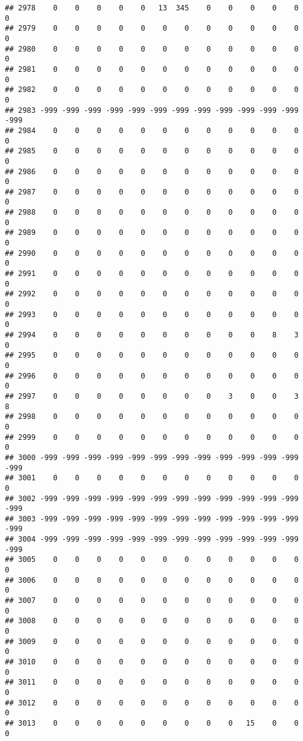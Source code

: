 \documentclass[]{article}
\begin{document}
\begin{verbatim}
## 2978    0    0    0    0    0   13  345    0    0    0    0    0    0
## 2979    0    0    0    0    0    0    0    0    0    0    0    0    0
## 2980    0    0    0    0    0    0    0    0    0    0    0    0    0
## 2981    0    0    0    0    0    0    0    0    0    0    0    0    0
## 2982    0    0    0    0    0    0    0    0    0    0    0    0    0
## 2983 -999 -999 -999 -999 -999 -999 -999 -999 -999 -999 -999 -999 -999
## 2984    0    0    0    0    0    0    0    0    0    0    0    0    0
## 2985    0    0    0    0    0    0    0    0    0    0    0    0    0
## 2986    0    0    0    0    0    0    0    0    0    0    0    0    0
## 2987    0    0    0    0    0    0    0    0    0    0    0    0    0
## 2988    0    0    0    0    0    0    0    0    0    0    0    0    0
## 2989    0    0    0    0    0    0    0    0    0    0    0    0    0
## 2990    0    0    0    0    0    0    0    0    0    0    0    0    0
## 2991    0    0    0    0    0    0    0    0    0    0    0    0    0
## 2992    0    0    0    0    0    0    0    0    0    0    0    0    0
## 2993    0    0    0    0    0    0    0    0    0    0    0    0    0
## 2994    0    0    0    0    0    0    0    0    0    0    8    3    0
## 2995    0    0    0    0    0    0    0    0    0    0    0    0    0
## 2996    0    0    0    0    0    0    0    0    0    0    0    0    0
## 2997    0    0    0    0    0    0    0    0    3    0    0    3    8
## 2998    0    0    0    0    0    0    0    0    0    0    0    0    0
## 2999    0    0    0    0    0    0    0    0    0    0    0    0    0
## 3000 -999 -999 -999 -999 -999 -999 -999 -999 -999 -999 -999 -999 -999
## 3001    0    0    0    0    0    0    0    0    0    0    0    0    0
## 3002 -999 -999 -999 -999 -999 -999 -999 -999 -999 -999 -999 -999 -999
## 3003 -999 -999 -999 -999 -999 -999 -999 -999 -999 -999 -999 -999 -999
## 3004 -999 -999 -999 -999 -999 -999 -999 -999 -999 -999 -999 -999 -999
## 3005    0    0    0    0    0    0    0    0    0    0    0    0    0
## 3006    0    0    0    0    0    0    0    0    0    0    0    0    0
## 3007    0    0    0    0    0    0    0    0    0    0    0    0    0
## 3008    0    0    0    0    0    0    0    0    0    0    0    0    0
## 3009    0    0    0    0    0    0    0    0    0    0    0    0    0
## 3010    0    0    0    0    0    0    0    0    0    0    0    0    0
## 3011    0    0    0    0    0    0    0    0    0    0    0    0    0
## 3012    0    0    0    0    0    0    0    0    0    0    0    0    0
## 3013    0    0    0    0    0    0    0    0    0   15    0    0    0

\end{verbatim}
\end{document}
